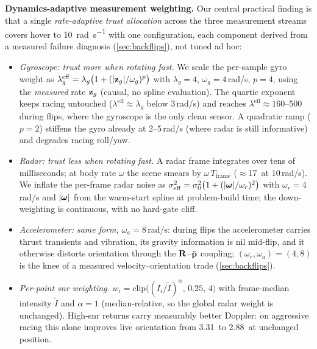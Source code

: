 \textbf{Dynamics-adaptive measurement weighting.}
Our central practical finding is that a single \emph{rate-adaptive trust
allocation} across the three measurement streams covers hover to
\SI{10}{\radian\per\second} with one configuration, each component derived
from a measured failure diagnosis (\autoref{sec:backflips}), not tuned ad hoc:
\begin{itemize}
\item \emph{Gyroscope: trust more when rotating fast.}
  We scale the per-sample gyro weight as
  $\lambda_g^{\mathrm{eff}} = \lambda_g\bigl(1 + (|\mathbf{z}_g|/\omega_g)^p\bigr)$
  with $\lambda_g{=}4$, $\omega_g{=}4$\,rad/s, $p{=}4$, using the
  \emph{measured} rate $\mathbf{z}_g$ (causal, no spline evaluation).  The quartic
  exponent keeps racing untouched ($\lambda^{\mathrm{eff}}\!\approx\!\lambda_g$
  below 3\,rad/s) and reaches $\lambda^{\mathrm{eff}}\!\approx\!160$--$500$
  during flips, where the gyroscope is the only clean sensor.  A
  quadratic ramp ($p{=}2$) stiffens the gyro already at 2--5\,rad/s
  (where radar is still informative) and degrades racing roll/yaw.
\item \emph{Radar: trust less when rotating fast.}
  A radar frame integrates over tens of milliseconds; at body rate
  $\omega$ the scene smears by $\omega\,T_{\mathrm{frame}}$
  ($\approx$17\degree\ at 10\,rad/s).  We inflate the per-frame
  radar noise as
  $\sigma_{\mathrm{eff}}^2 = \sigma_0^2\bigl(1+(|\boldsymbol{\omega}|/\omega_r)^2\bigr)$
  with
  $\omega_r{=}4$\,rad/s and $|\boldsymbol{\omega}|$ from the warm-start spline at
  problem-build time; the down-weighting is continuous, with no
  hard-gate cliff.
\item \emph{Accelerometer: same form,} $\omega_a{=}8$\,rad/s:
  during flips the accelerometer carries thrust transients and
  vibration, its gravity information is nil mid-flip, and it otherwise
  distorts orientation through the $\mathbf{R}$--$\ddot{\mathbf{p}}$ coupling;
  $(\omega_r,\omega_a){=}(4,8)$ is the knee of a measured velocity--orientation
  trade (\autoref{sec:backflips}).
\item \emph{Per-point \ac{snr} weighting.}
  $w_i = \mathrm{clip}\bigl((I_i/\tilde{I})^{\alpha},\,0.25,\,4\bigr)$
  with frame-median intensity $\tilde I$ and $\alpha{=}1$
  (median-relative, so the global radar weight is unchanged).  High-\ac{snr}
  returns carry measurably better Doppler: on aggressive racing this
  alone improves live orientation from 3.31\degree\ to 2.88\degree\ at
  unchanged position.
\end{itemize}

